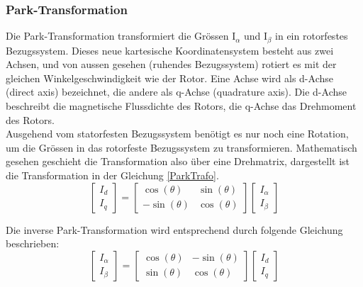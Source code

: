 \subsubsection*{Park-Transformation}
Die Park-Transformation transformiert die Grössen I$_{\alpha}$ und I$_{\beta}$ in ein rotorfestes Bezugssystem. Dieses neue kartesische Koordinatensystem besteht aus zwei Achsen, und von aussen gesehen (ruhendes Bezugssystem) rotiert es mit der gleichen Winkelgeschwindigkeit wie der Rotor. Eine Achse wird als d-Achse (direct axis) bezeichnet, die andere als q-Achse (quadrature axis). Die d-Achse beschreibt die magnetische Flussdichte des Rotors, die q-Achse das Drehmoment des Rotors. \\
Ausgehend vom statorfesten Bezugssystem benötigt es nur noch eine Rotation, um die Grössen in das rotorfeste Bezugssystem zu transformieren. Mathematisch gesehen geschieht die Transformation also über eine Drehmatrix, dargestellt ist die Transformation in der Gleichung \ref{ParkTrafo}. 
\begin{equation}\label{ParkTrafo}
\left[
	\begin{array}{c}
	I_d \\ 
	I_q
	\end{array} 
\right]
= 
\left[
	\begin{array}{cc}
	\cos (\theta) & \sin(\theta) \\
	-\sin(\theta)  & \cos(\theta)
	\end{array} 
\right] 
\left[
	\begin{array}{c}
	I_\alpha \\ 
	I_\beta
	\end{array} 
\right]
\end{equation}

Die inverse Park-Transformation wird entsprechend durch folgende Gleichung beschrieben:
\begin{equation}\label{invParkTrafo}
\left[
	\begin{array}{c}	
	I_\alpha \\ 
	I_\beta
	\end{array} 
\right]
= 
\left[
	\begin{array}{cc}
	\cos (\theta) & -\sin(\theta) \\
	\sin(\theta)  & \cos(\theta)
	\end{array} 
\right] 
\left[
	\begin{array}{c}
	I_d \\ 
	I_q
	\end{array} 
\right]
\end{equation}

